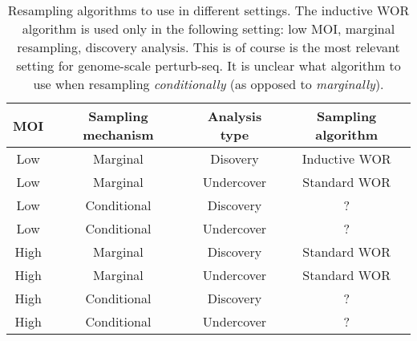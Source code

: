 \documentclass[12pt]{article}
\begin{document}
\begin{table}
\begin{tabular}{cccc}
	\hline 
	\textbf{MOI} & \textbf{Sampling mechanism} & \textbf{Analysis type} & \textbf{Sampling algorithm} \\ 
	\hline 
	Low & Marginal & Disovery &  Inductive WOR \\
	\hline 
	Low & Marginal & Undercover & Standard WOR \\ 
	\hline 
	Low & Conditional & Discovery &  ? \\ 
	\hline 
	Low & Conditional & Undercover & ? \\ 
	\hline 
	High & Marginal & Discovery & Standard WOR \\ 
	\hline 
	High & Marginal & Undercover & Standard WOR  \\ 
	\hline 
	High & Conditional & Discovery & ? \\ 
	\hline 
	High & Conditional & Undercover & ? \\ 
	\hline 
\end{tabular}
	\caption{Resampling algorithms to use in different settings. The inductive WOR algorithm is used only in the following setting: low MOI, marginal resampling, discovery analysis. This is of course is the most relevant setting for genome-scale perturb-seq. It is unclear what algorithm to use when resampling \textit{conditionally} (as opposed to \textit{marginally}).}	\label{sampling_algo}
\end{table}



\end{document}
